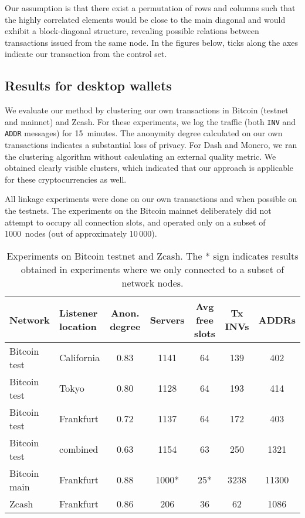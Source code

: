 Our assumption is that there exist a permutation of rows and columns such that the highly correlated elements would be close to the main diagonal and would exhibit a block-diagonal structure, revealing possible relations between transactions issued from the same node.
In the figures below, ticks along the axes indicate our transaction from the control set.


\subsection{Results for desktop wallets}

We evaluate our method by clustering our own transactions in Bitcoin (testnet and mainnet) and Zcash.
For these experiments, we log the traffic (both \texttt{INV} and \texttt{ADDR} messages) for 15~minutes.
The anonymity degree calculated on our own transactions indicates a substantial loss of privacy.
For Dash and Monero, we ran the clustering algorithm without calculating an external quality metric.
We obtained clearly visible clusters, which indicated that our approach is applicable for these cryptocurrencies as well.

All linkage experiments were done on our own transactions and when possible on the testnets.
The experiments on the Bitcoin mainnet deliberately did not attempt to occupy all connection slots, and operated only on a subset of 1000~nodes (out of approximately 10\,000).

\begin{table*}[!t]
	\normalsize
	\caption{Experiments on Bitcoin testnet and Zcash. The * sign indicates results obtained in experiments where we only connected to a subset of network nodes.}
	\centering
	\begin{tabular}{ | l | l | c | c | c | c | c | }
		\hline
		Network & Listener location & Anon. degree & Servers & Avg free slots & Tx INVs & ADDRs \\
		\hline
		Bitcoin test & California & 0.83 & 1141 & 64 & 139 & 402 \\
		Bitcoin test & Tokyo & 0.80 & 1128 & 64 & 193 & 414 \\
		Bitcoin test & Frankfurt & 0.72 & 1137 & 64 & 172 & 403 \\
		Bitcoin test & combined & 0.63 & 1154 & 63 & 250 & 1321 \\
		Bitcoin main & Frankfurt & 0.88 & 1000* & 25* & 3238 & 11300 \\
		Zcash & Frankfurt & 0.86 & 206 & 36 & 62 & 1086 \\
		\hline
	\end{tabular}
	\label{tab:results}
\end{table*}

